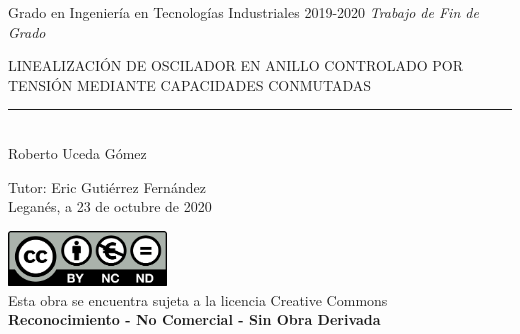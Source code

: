 \documentclass[12pt]{report} %
\begin{document}

\begin{titlepage}

	\begin{sffamily}
	\color{azulUC3M}
	\begin{center}
		\begin{figure}[H] %
		\end{figure}
		\vspace{2.5cm}
		\begin{Large}
			Grado en Ingeniería en Tecnologías Industriales		
			2019-2020
			\vspace{2cm}		
			\textsl{Trabajo de Fin de Grado}
			\bigskip
			
		\end{Large}
		 	{\Huge LINEALIZACIÓN DE OSCILADOR EN ANILLO CONTROLADO POR TENSIÓN MEDIANTE CAPACIDADES CONMUTADAS}\\
		 	\vspace*{0.5cm}
	 		\rule{10.5cm}{0.1mm}\\
			\vspace*{0.9cm}
			{\LARGE Roberto Uceda Gómez}\\ 
			\vspace*{1cm}
		\begin{Large}
			Tutor:
			Eric Gutiérrez Fernández \\
			Leganés, a 23 de octubre de 2020
		\end{Large}
	\end{center}
	\vfill
	\color{black}
	\includegraphics[width=4.2cm]{res/creativecommons.png}\\ %
	Esta obra se encuentra sujeta a la licencia Creative Commons\\ \textbf{Reconocimiento - No Comercial - Sin Obra Derivada}
	\end{sffamily}
\end{titlepage}
\end{document}
